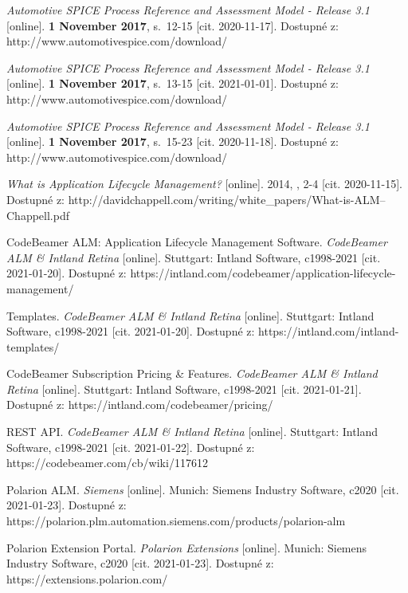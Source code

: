 \documentclass[czech,master,public,dept460,male,cpdeclaration,oneside]{diploma}
\begin{document}
\begin{thebibliography}{37}
\textit{Automotive SPICE Process Reference and Assessment Model - Release 3.1} [online]. \textbf{1 November 2017}, s.~12-15 [cit. 2020-11-17]. Dostupné z: http://www.automotivespice.com/download/


\textit{Automotive SPICE Process Reference and Assessment Model - Release 3.1} [online]. \textbf{1 November 2017}, s.~13-15 [cit. 2021-01-01]. Dostupné z: http://www.automotivespice.com/download/

\textit{Automotive SPICE Process Reference and Assessment Model - Release 3.1} [online]. \textbf{1 November 2017}, s.~15-23 [cit. 2020-11-18]. Dostupné z: http://www.automotivespice.com/download/

\textit{What is Application Lifecycle Management?} [online]. 2014, , 2-4 [cit. 2020-11-15]. Dostupné z: http://davidchappell.com/writing/white\_papers/What-is-ALM--Chappell.pdf

CodeBeamer ALM: Application Lifecycle Management Software. \textit{CodeBeamer ALM \& Intland Retina }[online]. Stuttgart: Intland Software, c1998-2021 [cit. 2021-01-20]. Dostupné z: https://intland.com/codebeamer/application-lifecycle-management/

Templates. \textit{CodeBeamer ALM \& Intland Retina} [online]. Stuttgart: Intland Software, c1998-2021 [cit. 2021-01-20]. Dostupné z: https://intland.com/intland-templates/

CodeBeamer Subscription Pricing \& Features. \textit{CodeBeamer ALM \& Intland Retina} [online]. Stuttgart: Intland Software, c1998-2021 [cit. 2021-01-21]. Dostupné z: https://intland.com/codebeamer/pricing/

REST API. \textit{CodeBeamer ALM \& Intland Retina} [online]. Stuttgart: Intland Software, c1998-2021 [cit. 2021-01-22]. Dostupné z: https://codebeamer.com/cb/wiki/117612

Polarion ALM. \textit{Siemens} [online]. Munich: Siemens Industry Software, c2020 [cit. 2021-01-23]. Dostupné z: https://polarion.plm.automation.siemens.com/products/polarion-alm

Polarion Extension Portal. \textit{Polarion Extensions} [online]. Munich: Siemens Industry Software, c2020 [cit. 2021-01-23]. Dostupné z: https://extensions.polarion.com/


\end{thebibliography}
\end{document}
